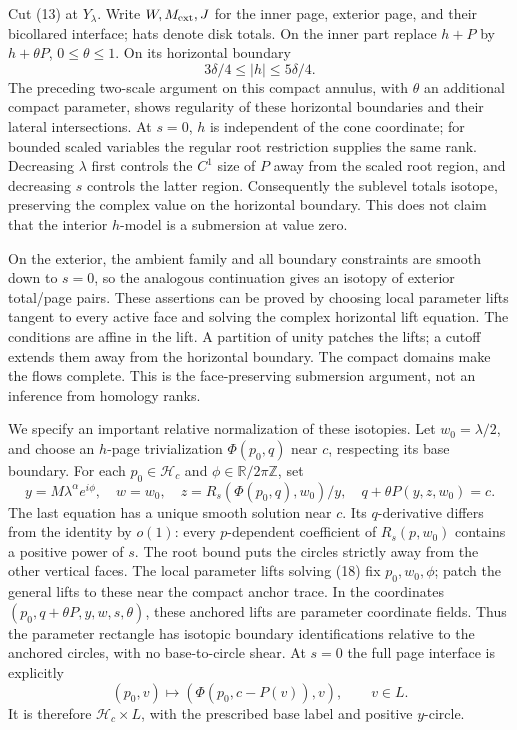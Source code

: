 \documentclass[11pt]{article}
\newcommand{\Z}{\mathbb Z}
\newcommand{\calH}{\mathcal H}
\begin{document}
Cut (13) at \(Y_\lambda\). Write \(W,M_{\rm ext},J\) for the
inner page, exterior page, and their bicollared interface; hats
denote disk totals. On the inner part replace \(h+P\) by
\(h+\theta P\), \(0\le\theta\le1\).
On its horizontal boundary
\[
                  3\delta/4\le |h|\le5\delta/4.    \tag{17}
\]
The preceding two-scale argument on this compact annulus, with
\(\theta\) an additional compact parameter, shows regularity
of these horizontal boundaries and their lateral intersections.
At \(s=0\), \(h\) is independent of the cone coordinate; for
bounded scaled variables the regular root restriction supplies
the same rank. Decreasing \(\lambda\) first controls the \(C^1\)
size of \(P\) away from the scaled root region, and decreasing
\(s\) controls the latter region.
Consequently the sublevel totals isotope, preserving the complex
value on the horizontal boundary. This does not claim that the
interior \(h\)-model is a submersion at value zero.

On the exterior, the ambient family and all boundary constraints
are smooth down to \(s=0\), so the analogous continuation gives
an isotopy of exterior total/page pairs. These assertions can be
proved by choosing local parameter lifts tangent to every active
face and solving the complex horizontal lift equation.
The conditions are affine in the lift. A partition of unity
patches the lifts; a cutoff extends them away from the horizontal
boundary. The compact domains make the flows complete.
This is the face-preserving submersion argument, not an inference
from homology ranks.

We specify an important relative normalization of these isotopies.
Let \(w_0=\lambda/2\), and choose an \(h\)-page trivialization
\(\Phi(p_0,q)\) near \(c\), respecting its base boundary.
For each \(p_0\in\calH_c\) and \(\phi\in\mathbb R/2\pi\Z\),
set
\[
 y=M\lambda^\alpha e^{i\phi},\quad w=w_0,\quad
 z=R_s(\Phi(p_0,q),w_0)/y,
\quad q+\theta P(y,z,w_0)=c.                        \tag{18}
\]
The last equation has a unique smooth solution near \(c\).
Its \(q\)-derivative differs from the identity by \(o(1)\):
every \(p\)-dependent coefficient of \(R_s(p,w_0)\)
contains a positive power of \(s\).
The root bound puts the circles strictly away from the other
vertical faces. The local parameter lifts solving (18) fix
\(p_0,w_0,\phi\); patch the general lifts to these near the
compact anchor trace. In the coordinates
\((p_0,q+\theta P,y,w,s,\theta)\), these anchored lifts
are parameter coordinate fields.
Thus the parameter rectangle has isotopic boundary
identifications relative to the anchored circles, with no
base-to-circle shear.
At \(s=0\) the full page interface is explicitly
\[
 (p_0,v)\longmapsto(\Phi(p_0,c-P(v)),v),\qquad v\in L.
                                                                    \tag{19}
\]
It is therefore \(\calH_c\times L\), with the prescribed
base label and positive \(y\)-circle.
\end{document}
